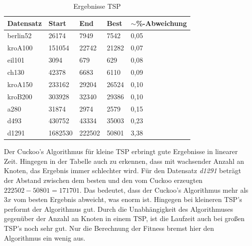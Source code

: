 \documentclass[conference]{IEEEtran}
\begin{document}
      \begin{table}[b]
        \label{table:TSP}
        \centering
        \begin{tabular}{|l|ll|l|l|}
        \hline
            Datensatz & \multicolumn{1}{l|}{Start} & End  & Best & $\sim$\%-Abweichung \\ \hline
            berlin52  & \multicolumn{1}{l|}{26174} & 7949 & 7542 & 0,05       \\ \hline
            kroA100  & \multicolumn{1}{l|}{151054} & 22742 & 21282 & 0,07      \\ \hline
            eil101  & \multicolumn{1}{l|}{3094} & 679 & 629 &  0,08      \\ \hline
            ch130  & \multicolumn{1}{l|}{42378} & 6683 & 6110 & 0,09       \\ \hline
            kroA150  & \multicolumn{1}{l|}{233162} & 29204 &   26524& 0,10     \\ \hline
            kroB200  & \multicolumn{1}{l|}{303928} &  32340&  29386 & 0,10     \\ \hline
            a280  & \multicolumn{1}{l|}{31874} & 2974 & 2579 & 0,15       \\ \hline
            d493  & \multicolumn{1}{l|}{430752} & 43334 & 35003 & 0,23       \\ \hline
            d1291  & \multicolumn{1}{l|}{1682530} & 222502 & 50801 & 3,38       \\ \hline
        \end{tabular}
        \caption{Ergebnisse TSP}
      \end{table}

      Der Cuckoo's Algorithmus für kleine TSP erbringt gute Ergebnisse in linearer Zeit. Hingegen in der Tabelle auch zu erkennen, dass 
      mit wachsender Anzahl an Knoten, das Ergebnis immer schlechter wird. Für den Datensatz \textit{d1291} beträgt der Abstand zwischen dem besten und den vom Cuckoo erzeugten
      $222502 - 50801 = 171701$. Das bedeutet, dass der Cuckoo's Algorithmus mehr als $3x$ vom besten Ergebnis abweicht, was enorm ist. 
      Hingegen bei kleineren TSP's performt der Algorithmus gut. 
      Durch die Unabhängigkeit des Algorithmuses gegenüber der Anzahl an Knoten in einem TSP, ist die Laufzeit auch bei großen
      TSP's noch sehr gut. Nur die Berechnung der Fitness bremst hier den Algorithmus ein wenig aus. 
      
\end{document}
